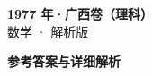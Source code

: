 \documentclass[zihao=-4, a4paper]{ctexart}
\begin{document}
\begin{center}
  {\Large\bfseries 1977 年·广西卷（理科）}\\[4pt]
  {\large 数学 · 解析版}
\end{center}
\medskip
{}

\clearpage
{}
\begin{center}{\Large\bfseries 参考答案与详细解析}\end{center}
\medskip

\end{document}
